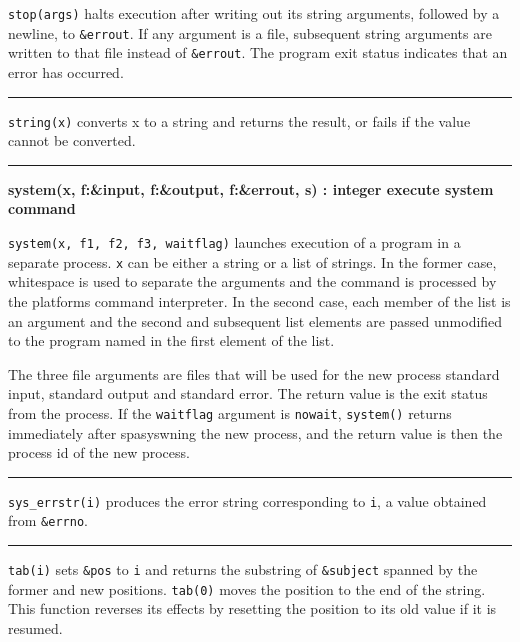 \noindent
{}\texttt{stop(args)} halts execution after
writing out its string arguments, followed by a newline, to
\texttt{\&errout}. If any argument is a file, subsequent string
arguments are written to that file instead of \texttt{\&errout}. The
program exit status indicates that an error has occurred.

\bigskip\hrule\vspace{0.1cm}

\noindent
{}\texttt{string(x)} converts x
to a string and returns the result, or fails if the value cannot be
converted.

\bigskip\hrule\vspace{0.1cm}
\noindent
{\bf system(x, f:\&input, f:\&output, f:\&errout, s) : integer \hfill 
execute system command}

\noindent
{}\texttt{system(x, f1, f2, f3, waitflag)} launches
execution of a program in a separate process. \texttt{x} can be either
a string or a list of strings. In the former case, whitespace is used
to separate the arguments and the command is processed by the
platform{\textquotesingle}s command interpreter. In the second case,
each member of the list is an argument and the second and subsequent
list elements are passed unmodified to the program named in the first
element of the list.

The three file arguments are files that will be used for the new
process{\textquotesingle} standard input, standard output and standard
error. The return value is the exit status from the process. If the
\texttt{waitflag} argument is
\texttt{{\textquotedbl}nowait{\textquotedbl}}, \texttt{system()}
returns immediately after spasyswning the new process, and the return
value is then the process id of the new process.

\bigskip\hrule\vspace{0.1cm}

\noindent
{}\texttt{sys\_errstr(i)} produces the error string
corresponding to \texttt{i}, a value obtained from \texttt{\&errno}.

\bigskip\hrule\vspace{0.1cm}

\noindent
{}\texttt{tab(i)} sets \texttt{\&pos} to \texttt{i} and
returns the substring of \texttt{\&subject} spanned by the former and
new positions. \texttt{tab(0)} moves the position to the end of the
string. This function reverses its effects by resetting the position to
its old value if it is resumed.

